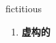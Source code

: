 
\begin{frame}
{\huge fictitious}
\begin{center}
\begin{enumerate}\Large
  \item \textbf{虚构的}
\end{enumerate}
\end{center}
\end{frame}
